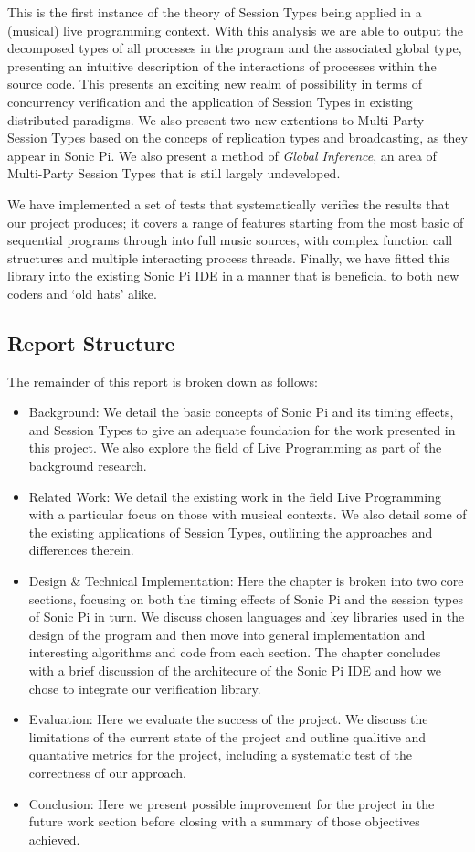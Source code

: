 \documentclass[11pt, abstracton, twoside, titlepage=true]{scrartcl}
\begin{document}
This is the first instance of the theory of Session Types being applied in 
a (musical) live programming context. With this analysis we are able to output 
the decomposed types of all processes in the program and the associated global 
type, presenting an intuitive description of the interactions of processes 
within the source code. This presents an exciting new realm of possibility in
terms of concurrency verification and the application of Session Types in 
existing distributed paradigms. We also present two new extentions to Multi-Party 
Session Types based on the conceps of replication types and broadcasting, as they 
appear in Sonic Pi. We also present a method of \emph{Global Inference}, an area 
of Multi-Party Session Types that is still largely undeveloped.

We have implemented a set of tests that systematically verifies the results that
our project produces; it covers a range of features starting from the most basic
of sequential programs through into full music sources, with complex function
call structures and multiple interacting process threads. Finally, we have fitted
this library into the existing Sonic Pi IDE in a manner that is beneficial to both
new coders and `old hats' alike. 

\subsection{Report Structure}
The remainder of this report is broken down as follows:

\begin{itemize}
	\item Background: We detail the basic concepts of Sonic Pi and its timing 
	effects, and Session Types to give an adequate foundation for the work 
	presented in this project. We also explore the field of Live Programming 
	as part of the background research.
	\item Related Work: We detail the existing work in the field Live Programming
	with a particular focus on those with musical contexts. We also detail some
	of the existing applications of Session Types, outlining the approaches and
	differences therein.
	\item Design \& Technical Implementation: Here the chapter is broken into
	two core sections, focusing on both the timing effects of Sonic Pi and
	the session types of Sonic Pi in turn. We discuss chosen languages and key
	libraries used in the design of the program and then move into general
	implementation and interesting algorithms and code from each section. The
	chapter concludes with a brief discussion of the architecure of the Sonic 
	Pi IDE and how we chose to integrate our verification library.
	\item Evaluation: Here we evaluate the success of the project. We discuss
	the limitations of the current state of the project and outline qualitive
	and quantative metrics for the project, including a systematic test of
	the correctness of our approach.
	\item Conclusion: Here we present possible improvement for the project in
	the future work section before closing with a summary of those objectives
	achieved.
\end{itemize}
\newpage
\end{document}
